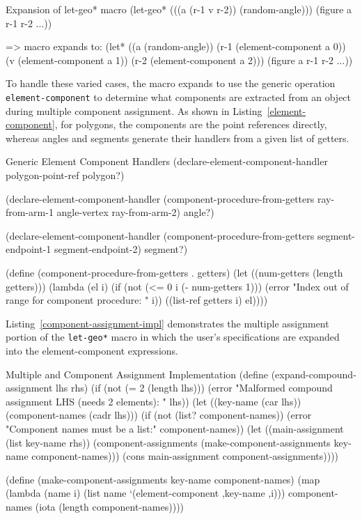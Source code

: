 \begin{repl-example}
[label=letgeo-expansion]
{Expansion of let-geo* macro}
(let-geo* (((a (r-1 v r-2)) (random-angle)))
  (figure a r-1 r-2 ...))

=> macro expands to:
(let* ((a (random-angle))
       (r-1 (element-component a 0))
       (v   (element-component a 1))
       (r-2 (element-component a 2)))
  (figure a r-1 r-2 ...))
\end{repl-example}

To handle these varied cases, the macro expands to use the generic operation
\texttt{element-component} to determine what components are extracted
from an object during multiple component assignment. As shown in
Listing~\ref{element-component}, for polygons, the components are the
point references directly, whereas angles and segments generate their
handlers from a given list of getters.

\begin{code-listing}
[label=element-component]
{Generic Element Component Handlers}
(declare-element-component-handler polygon-point-ref polygon?)

(declare-element-component-handler
 (component-procedure-from-getters
   ray-from-arm-1 angle-vertex ray-from-arm-2)
 angle?)

(declare-element-component-handler
 (component-procedure-from-getters
   segment-endpoint-1 segment-endpoint-2)
 segment?)

(define (component-procedure-from-getters . getters)
  (let ((num-getters (length getters)))
    (lambda (el i)
      (if (not (<= 0 i (- num-getters 1)))
          (error "Index out of range for component procedure: " i))
      ((list-ref getters i) el))))
\end{code-listing}

Listing~\ref{component-assignment-impl} demonstrates the multiple
assignment portion of the \texttt{let-geo*} macro in which the user's
specifications are expanded into the element-component expressions.

\begin{code-listing}
[label=component-assignment-impl]
{Multiple and Component Assignment Implementation}
(define (expand-compound-assignment lhs rhs)
  (if (not (= 2 (length lhs)))
      (error "Malformed compound assignment LHS (needs 2 elements): " lhs))
  (let ((key-name (car lhs))
        (component-names (cadr lhs)))
    (if (not (list? component-names))
        (error "Component names must be a list:" component-names))
    (let ((main-assignment (list key-name rhs))
          (component-assignments
           (make-component-assignments key-name component-names)))
      (cons main-assignment
            component-assignments))))

(define (make-component-assignments key-name component-names)
  (map (lambda (name i)
         (list name `(element-component ,key-name ,i)))
       component-names
       (iota (length component-names))))
\end{code-listing}

